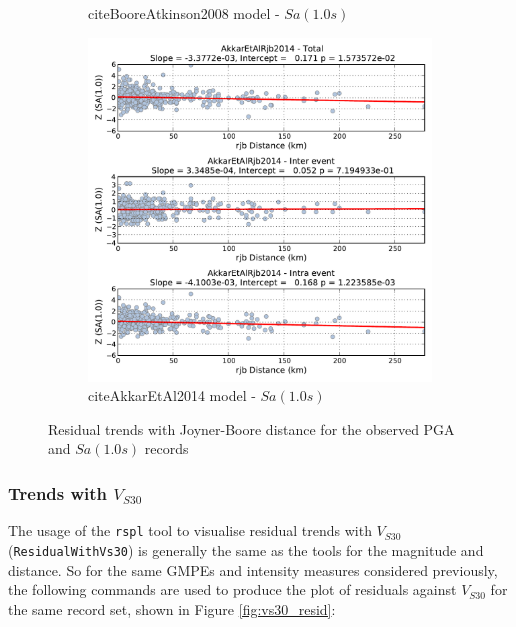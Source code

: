 \begin{figure}[htb]
\begin{subfigure}[b]{0.49\textwidth}
      \caption{citeBooreAtkinson2008 model - $Sa \left( {1.0 s} \right)$}
      \label{fig:sa1_dist_ba2008}
  \end{subfigure}
      \begin{subfigure}[b]{0.49\textwidth}
      \includegraphics[width=\textwidth]{./figures/residuals/Akkar2014_Distance_Sa1.pdf}
     \caption{citeAkkarEtAl2014 model - $Sa \left( {1.0 s} \right)$}
      \label{fig:sa1_dist_akkar2014}
  \end{subfigure}
  \caption{Residual trends with Joyner-Boore distance for the observed PGA and $Sa \left( {1.0 s} \right)$ records}
  \label{fig:dist_resid}
\end{figure}

\subsubsection{Trends with $V_{S30}$}

The usage of the \verb=rspl= tool to visualise residual trends with $V_{S30}$ (\verb=ResidualWithVs30=) is generally the same as the tools for the magnitude and distance. So for the same GMPEs and intensity measures considered previously, the following commands are used to produce the plot of residuals against $V_{S30}$ for the same record set, shown in Figure \ref{fig:vs30_resid}:
 
